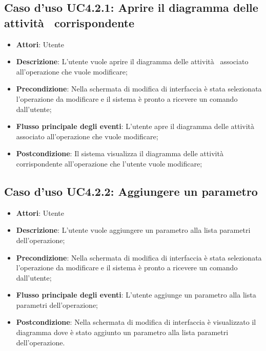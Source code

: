 \documentclass[../AnalisiDeiRequisiti.tex]{subfiles}
\begin{document}
			\subsection{Caso d'uso UC4.2.1: Aprire il diagramma delle attività  corrispondente}
			\begin{itemize}
				\item \textbf{Attori}: Utente
				\item \textbf{Descrizione}: L'utente vuole aprire il diagramma delle attività  associato all'operazione che vuole modificare;
				\item \textbf{Precondizione}: Nella schermata di modifica di interfaccia è stata selezionata l'operazione da modificare e il sistema è pronto a ricevere un comando dall'utente;
				\item \textbf{Flusso principale degli eventi}: L'utente apre il diagramma delle attività  associato all'operazione che vuole modificare;
				\item \textbf{Postcondizione}: Il sistema visualizza il diagramma delle attività  corrispondente all'operazione che l'utente vuole modificare;
			\end{itemize}
			\subsection{Caso d'uso UC4.2.2: Aggiungere un parametro}
			\begin{itemize}
				\item \textbf{Attori}: Utente
				\item \textbf{Descrizione}: L'utente vuole aggiungere un parametro alla lista parametri dell'operazione;
				\item \textbf{Precondizione}: Nella schermata di modifica di interfaccia è stata selezionata l'operazione da modificare e il sistema è pronto a ricevere un comando dall'utente;
				\item \textbf{Flusso principale degli eventi}: L'utente aggiunge un parametro alla lista parametri dell'operazione;
				\item \textbf{Postcondizione}: Nella schermata di modifica di interfaccia è visualizzato il diagramma dove è stato aggiunto un parametro alla lista parametri dell'operazione.
			\end{itemize}
\end{document}
